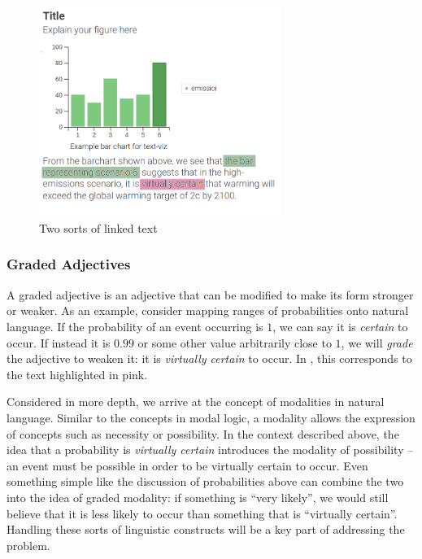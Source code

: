 \begin{figure}
   \includegraphics[width=0.7\textwidth]{fig/text-viz-types.png}
   \caption{Two sorts of linked text}
   \label{fig:linked-text-types}
\end{figure}

\subsubsection{Graded Adjectives}
A graded adjective is an adjective that can be modified to make its form stronger or weaker.
As an example, consider mapping ranges of probabilities onto natural language. If the probability
of an event occurring is $1$, we can say it is \emph{certain} to occur. If instead it is $0.99$
or some other value arbitrarily close to $1$, we will \emph{grade} the adjective to weaken it:
it is \emph{virtually certain} to occur. In , this corresponds to the text
highlighted in pink.

Considered in more depth, we arrive at the concept of modalities in natural language. Similar to 
the concepts in modal logic, a modality allows the expression of concepts such as necessity or possibility.
In the context described above, the idea that a probability is \emph{virtually certain} introduces the modality of
possibility -- an event must be possible in order to be virtually certain to occur. Even something simple
like the discussion of probabilities above can combine the two into the idea of graded modality:
if something is ``very likely'', we would still believe that it is less likely to occur than something that
is ``virtually certain''. Handling these sorts of linguistic constructs will be a key part of addressing
the problem. 

